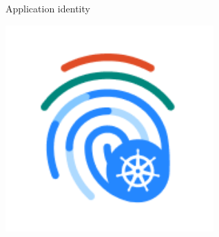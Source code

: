 \documentclass[black,white,aspectratio=169]{beamer}
\DeclareRobustCommand{\#}{\adjustbox{valign=B,totalheight=.57\baselineskip}{\oldhash}}%
\begin{document}
\begin{frame}{Application identity}
\begin{table}
\begin{subtable}[r]{0.2\textwidth}
                \includegraphics[width=0.6\textwidth]{identity.png}
            \end{subtable}
        \end{table}
    \end{frame}
\end{document}
